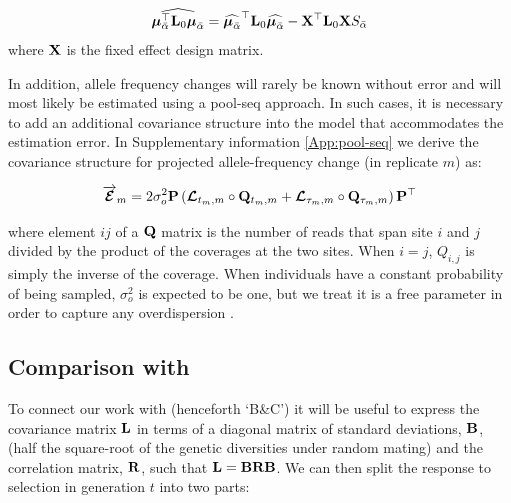 \documentclass[12pt]{article}
\begin{document}
\begin{bibunit}
\begin{equation} 
\widehat{\boldsymbol{\mu}_{\bar{\alpha}}^{\top}{\bf L}_0\boldsymbol{\mu}_{\bar{\alpha}}}= \widehat{\boldsymbol{\mu}_{\bar{\alpha}}}^{\top}{\bf L}_0\widehat{\boldsymbol{\mu}_{\bar{\alpha}}}-{\bf X}^{\top}{\bf L}_0{\bf X}{S}_{\bar{\alpha}}
\end{equation}
where ${\bf X}$ is the fixed effect design matrix.

In addition, allele frequency changes will rarely be known without error and will most likely be estimated using a pool-seq approach. In such cases, it is necessary to add an additional covariance structure into the model that accommodates the estimation error. In Supplementary information \ref{App:pool-seq} we derive the covariance structure for projected allele-frequency change (in replicate $m$) as:


\begin{equation}
\overrightarrow{\boldsymbol{\mathcal{E}}}_m = 2\sigma^2_o{\bf P}\left(\boldsymbol{\mathcal L}_{t_m,m}\circ{\bf Q}_{t_m,m}+\boldsymbol{\mathcal L}_{\tau_m,m}\circ{\bf Q}_{\tau_m,m}\right){\bf P}^{\top}
\end{equation}

where element $ij$ of a ${\bf Q}$ matrix is the number of reads that span site $i$ and $j$ divided by the product of the coverages at the two sites. When $i=j$, $Q_{i,j}$ is simply the inverse of the coverage. When individuals have a constant probability of being sampled, $\sigma^2_o$ is expected to be one, but we treat it is a free parameter in order to capture any overdispersion \citep{McCullagh.1989}.

\subsection*{Comparison with  \citet{buffalo2019linked}}


To connect our work with \citet{buffalo2019linked} (henceforth `B\&C') it will be useful to express the covariance matrix  ${\bf L}$ in terms of a diagonal matrix of standard deviations,  ${\bf B}$, (half the square-root of the genetic diversities under random mating) and the correlation matrix, ${\bf R}$, such that  ${\bf L}={\bf B}{\bf R}{\bf B}$. We can then split the response to selection in generation $t$ into two parts:


\end{bibunit}
\end{document}

